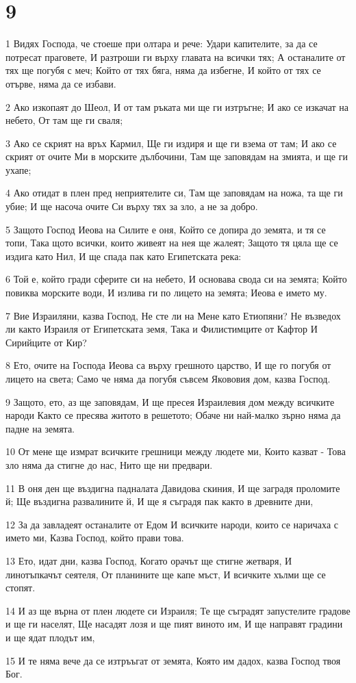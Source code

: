 \chapter{9}

\par 1 Видях Господа, че стоеше при олтара и рече: Удари капителите, за да се потресат праговете, И разтроши ги върху главата на всички тях; А останалите от тях ще погубя с меч; Който от тях бяга, няма да избегне, И който от тях се отърве, няма да се избави.
\par 2 Ако изкопаят до Шеол, И от там ръката ми ще ги изтръгне; И ако се изкачат на небето, От там ще ги сваля;
\par 3 Ако се скрият на връх Кармил, Ще ги издиря и ще ги взема от там; И ако се скрият от очите Ми в морските дълбочини, Там ще заповядам на змията, и ще ги ухапе;
\par 4 Ако отидат в плен пред неприятелите си, Там ще заповядам на ножа, та ще ги убие; И ще насоча очите Си върху тях за зло, а не за добро.
\par 5 Защото Господ Иеова на Силите е оня, Който се допира до земята, и тя се топи, Така щото всички, които живеят на нея ще жалеят; Защото тя цяла ще се издига като Нил, И ще спада пак като Египетската река:
\par 6 Той е, който гради сферите си на небето, И основава свода си на земята; Който повиква морските води, И излива ги по лицето на земята; Иеова е името му.
\par 7 Вие Израиляни, казва Господ, Не сте ли на Мене като Етиопяни? Не възведох ли както Израиля от Египетската земя, Така и Филистимците от Кафтор И Сирийците от Кир?
\par 8 Ето, очите на Господа Иеова са върху грешното царство, И ще го погубя от лицето на света; Само че няма да погубя съвсем Якововия дом, казва Господ.
\par 9 Защото, ето, аз ще заповядам, И ще пресея Израилевия дом между всичките народи Както се пресява житото в решетото; Обаче ни най-малко зърно няма да падне на земята.
\par 10 От мене ще измрат всичките грешници между людете ми, Които казват - Това зло няма да стигне до нас, Нито ще ни предвари.
\par 11 В оня ден ще въздигна падналата Давидова скиния, И ще заградя проломите й; Ще въздигна развалините й, И ще я съградя пак както в древните дни,
\par 12 За да завладеят останалите от Едом И всичките народи, които се наричаха с името ми, Казва Господ, който прави това.
\par 13 Ето, идат дни, казва Господ, Когато орачът ще стигне жетваря, И линотъпкачът сеятеля, От планините ще капе мъст, И всичките хълми ще се стопят.
\par 14 И аз ще върна от плен людете си Израиля; Те ще съградят запустелите градове и ще ги населят, Ще насадят лозя и ще пият виното им, И ще направят градини и ще ядат  плодът им,
\par 15 И те няма вече да се изтръъгат от земята, Която им дадох, казва Господ твоя Бог.

